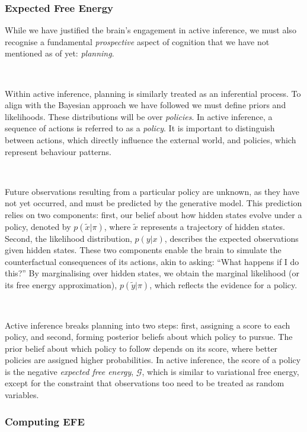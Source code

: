 \documentclass{article}
\begin{document}
\subsubsection{Expected Free Energy}

While we have justified the brain's engagement in active inference, we must also recognise a fundamental \textit{prospective} aspect of cognition that we have not mentioned as of yet: \textit{planning}.

\

Within active inference, planning is similarly treated as an inferential process. To align with the Bayesian approach we have followed we must define priors and likelihoods. These distributions will be over \textit{policies}. In active inference, a sequence of actions is referred to as a \textit{policy}. It is important to distinguish between actions, which directly influence the external world, and policies, which represent behaviour patterns.

\

Future observations resulting from a particular policy are unknown, as they have not yet occurred, and must be predicted by the generative model. This prediction relies on two components: first, our belief about how hidden states evolve under a policy, denoted by $p(\tilde{x} | \pi)$, where $\tilde{x}$ represents a trajectory of hidden states. Second, the likelihood distribution, $p(y | x)$, describes the expected observations given hidden states. These two components enable the brain to simulate the counterfactual consequences of its actions, akin to asking: ``What happens if I do this?'' By marginalising over hidden states, we obtain the marginal likelihood (or its free energy approximation), $p(\tilde{y} | \pi)$, which reflects the evidence for a policy.

\

Active inference breaks planning into two steps: first, assigning a score to each policy, and second, forming posterior beliefs about which policy to pursue. The prior belief about which policy to follow depends on its score, where better policies are assigned higher probabilities. In active inference, the score of a policy is the negative \textit{expected free energy}, $\mathcal{G}$, which is similar to variational free energy, except for the constraint that observations too need to be treated as random variables.

\subsubsection{Computing EFE}
\end{document}
